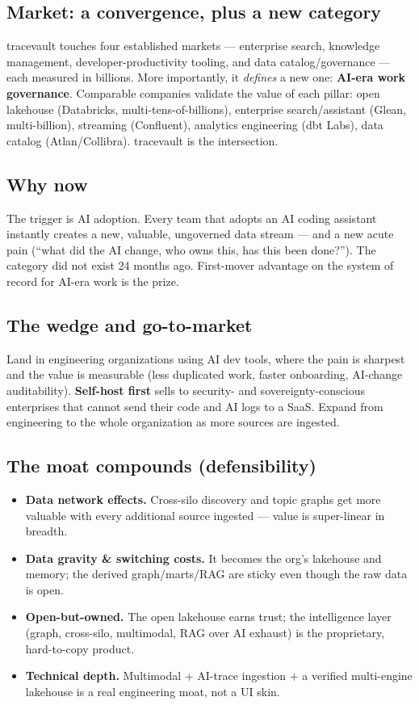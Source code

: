 \documentclass[11pt]{article}
\newcommand{\kw}[1]{\textcolor{tvaccent}{\textbf{#1}}}
\begin{document}
\subsection{Market: a convergence, plus a new category}
tracevault touches four established markets --- enterprise search, knowledge management,
developer-productivity tooling, and data catalog/governance --- each measured in billions. More
importantly, it \emph{defines} a new one: \kw{AI-era work governance}. Comparable companies validate
the value of each pillar: open lakehouse (Databricks, multi-tens-of-billions), enterprise
search/assistant (Glean, multi-billion), streaming (Confluent), analytics engineering (dbt Labs), data
catalog (Atlan/Collibra). tracevault is the intersection.

\subsection{Why now}
The trigger is AI adoption. Every team that adopts an AI coding assistant instantly creates a new,
valuable, ungoverned data stream --- and a new acute pain (``what did the AI change, who owns this,
has this been done?''). The category did not exist 24 months ago. First-mover advantage on the system
of record for AI-era work is the prize.

\subsection{The wedge and go-to-market}
Land in engineering organizations using AI dev tools, where the pain is sharpest and the value is
measurable (less duplicated work, faster onboarding, AI-change auditability). \textbf{Self-host first}
sells to security- and sovereignty-conscious enterprises that cannot send their code and AI logs to a
SaaS. Expand from engineering to the whole organization as more sources are ingested.

\subsection{The moat compounds (defensibility)}
\begin{itemize}[leftmargin=1.4em,itemsep=2pt]
  \item \textbf{Data network effects.} Cross-silo discovery and topic graphs get more valuable with
  every additional source ingested --- value is super-linear in breadth.
  \item \textbf{Data gravity \& switching costs.} It becomes the org's lakehouse and memory; the
  derived graph/marts/RAG are sticky even though the raw data is open.
  \item \textbf{Open-but-owned.} The open lakehouse earns trust; the intelligence layer (graph,
  cross-silo, multimodal, RAG over AI exhaust) is the proprietary, hard-to-copy product.
  \item \textbf{Technical depth.} Multimodal + AI-trace ingestion + a verified multi-engine lakehouse
  is a real engineering moat, not a UI skin.
\end{itemize}
\end{document}
